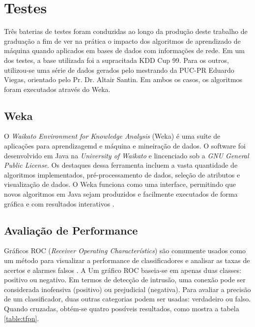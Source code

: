 \chapter{Testes}
Três baterias de testes foram conduzidas ao longo da produção deste trabalho de graduação a fim de ver na prática o
impacto dos algoritmos de aprendizado de máquina quando aplicados em bases de dados com informações de rede.
Em um dos testes, a base utilizada foi a supracitada KDD Cup 99. Para os outros, utilizou-se uma série de dados
 gerados pelo mestrando da PUC-PR Eduardo Viegas, orientado pelo Pr. Dr. Altair Santin. Em ambos os casos, os algoritmos foram
 executados através do Weka.

\section{Weka}
O \textit{Waikato Environment for Knowledge Analysis} (Weka) é uma suíte de aplicações para aprendizagemd e máquina e
mineiração de dados. O software foi desenvolvido em Java na \textit{University of Waikato} e lincenciado sob a
\textit{GNU General Public License}. Os destaques dessa ferramenta incluem a vasta quantidade de algoritmos
implementados, pré-processamento de dados, seleção de atributos e visualização de dados. O Weka funciona como uma
interface, permitindo que novos algoritmos em Java sejam produzidos e facilmente executados de forma gráfica e com
resultados interativos \cite{bouckaert10}.

\section{Avaliação de Performance}
Gráficos ROC (\textit{Receiver Operating Characterístics}) são comumente usados como um método  para visualizar
a performance de classificadores e analisar as taxas de acertos e alarmes falsos \cite{fawcett04}. A Um gráfico ROC
baseia-se em apenas duas classes: positivo ou negativo. Em termos de detecção de intrusão, uma conexão pode ser
considerada inofensiva (positivo) ou prejudicial (negativa). Para avaliar a precisão de um classificador,
duas outras categorias podem ser usadas: verdadeiro ou falso. Quando cruzadas, obtém-se quatro possíveis resultados,
como mostra a tabela \ref{table:tfpn}.

